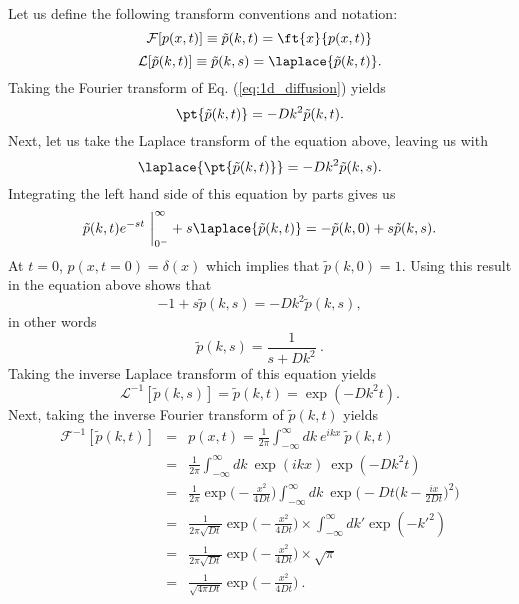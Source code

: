 Let us define the following transform conventions and notation:
\begin{equation}
\mathcal{F} [p(x ,t)] \equiv   \tilde{p}(k, t) = \ft{x}{p(x,t)}
\end{equation}
\begin{equation}
\mathcal{L} [ \tilde{p}(k, t)] \equiv  \tilde{p}(k, s) = \laplace{\tilde{p}(k, t)}.
\end{equation}
Taking the Fourier transform of Eq. (\ref{eq:1d_diffusion}) yields
\begin{equation}
\pt{\tilde{p}(k, t)} = -D k^2 \tilde{p}(k, t).
\end{equation}
Next, let us take the Laplace transform of the equation above, leaving us with
\begin{equation}
\laplace{\pt{\tilde{p}(k, t)}} = -D k^2 \tilde{p}(k, s).
\end{equation}
Integrating the left hand side of this equation by parts gives us
\begin{equation}
\tilde{p}(k, t) e^{-s t}~\bigg|_{0^{-}}^{\infty} + s \laplace{\tilde{p}(k, t)} = -\tilde{p}(k, 0) + s \tilde{p}(k, s).
\end{equation}
At $t=0$, $p(x,t=0) = \delta(x)$ which implies that $\tilde{p}(k, 0) = 1$. Using this result in the equation above shows that
\begin{equation}
-1 + s \tilde{p}(k, s) = -D k^2 \tilde{p}(k, s),
\end{equation}
in other words
\begin{equation}
\boxed{\tilde{p}(k, s)  = \frac{1}{s + D k^2}}~.
\end{equation}
Taking the inverse Laplace transform of this equation yields
\begin{equation}
\mathcal{L}^{-1} [\tilde{p}(k, s)] = \tilde{p}(k, t) = \exp(-D k^2 t).
\end{equation}
Next, taking the inverse Fourier transform of $\tilde{p}(k, t)$ yields
\begin{eqnarray}
\mathcal{F}^{-1} [\tilde{p}(k, t)] &=& p(x,t)  = \frac{1}{2 \pi } \int_{-\infty}^{\infty} dk~e^{i k x}~\tilde{p}(k, t)  \nonumber \\
&=& \frac{1}{2 \pi } \int_{-\infty}^{\infty} dk~\exp(i k x)~ \exp(-D k^2 t) \nonumber  \\
&=& \frac{1}{2 \pi } \exp\bigg(- \frac{x^2}{4 D t} \bigg) \int_{-\infty}^{\infty} dk~\exp \Bigg(-D t \bigg(k-\frac{i x}{2 D t}\bigg) ^2\Bigg) \nonumber \\
&=& \frac{1}{2 \pi \sqrt{D t} } \exp\bigg(- \frac{x^2}{4 D t} \bigg) \times \int_{-\infty}^{\infty} dk' \exp (-k'^2 ) \nonumber \\
&=& \frac{1}{2 \pi \sqrt{D t} } \exp\bigg(- \frac{x^2}{4 D t} \bigg) \times \sqrt{\pi} \nonumber \\
&=& \boxed{\frac{1}{\sqrt{4 \pi D t} } \exp\bigg(- \frac{x^2}{4 D t}\bigg)}~.
\end{eqnarray}

